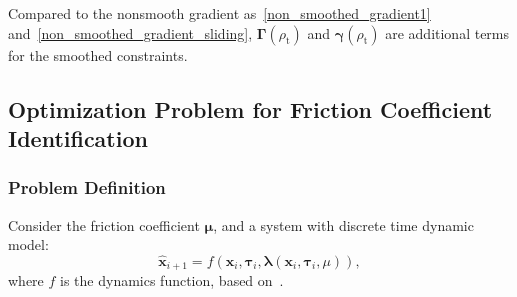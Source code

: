 Compared to the nonsmooth gradient as~\eqref{non_smoothed_gradient1} and~\eqref{non_smoothed_gradient_sliding}, $\mathbf{\Gamma}(\rho_\mathrm{t})$ and $\mathbf{\gamma}(\rho_\mathrm{t})$ are additional terms for the smoothed constraints.



\subsection{Optimization Problem for Friction Coefficient Identification}

\subsubsection{Problem Definition}
Consider the friction coefficient $\mathbf{\mu}$, and a system with discrete time dynamic model:
\begin{equation}
\label{osi_dyn}
     \hat{\mathbf{x}}_{i+1} = {f}(\mathbf{x}_i,\boldsymbol{\tau}_i,\mathbf{\bm{\lambda}}(\mathbf{x}_i,\boldsymbol{\tau}_i,\mu)),
 \end{equation}
 where ${f}$ is the dynamics function, based on~\cite{raisim}.
 

